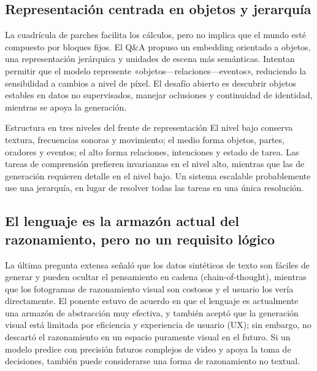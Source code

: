 
\subsection{Representación centrada en objetos y jerarquía}

La cuadrícula de parches facilita los cálculos, pero no implica que el mundo esté compuesto por bloques fijos. El Q\&A propuso un embedding orientado a objetos, una representación jerárquica y unidades de escena más semánticas. Intentan permitir que el modelo represente «objetos—relaciones—eventos», reduciendo la sensibilidad a cambios a nivel de píxel. El desafío abierto es descubrir objetos estables en datos no supervisados, manejar oclusiones y continuidad de identidad, mientras se apoya la generación.

\begin{knowledgebox}{Estructura en tres niveles del frente de representación}
El nivel bajo conserva textura, frecuencias sonoras y movimiento; el medio forma objetos, partes, oradores y eventos; el alto forma relaciones, intenciones y estado de tarea. Las tareas de comprensión prefieren invarianzas en el nivel alto, mientras que las de generación requieren detalle en el nivel bajo. Un sistema escalable probablemente use una jerarquía, en lugar de resolver todas las tareas en una única resolución.
\end{knowledgebox}

\subsection{El lenguaje es la armazón actual del razonamiento, pero no un requisito lógico}

La última pregunta extensa señaló que los datos sintéticos de texto son fáciles de generar y pueden ocultar el pensamiento en cadena (chain-of-thought), mientras que los fotogramas de razonamiento visual son costosos y el usuario los vería directamente. El ponente estuvo de acuerdo en que el lenguaje es actualmente una armazón de abstracción muy efectiva, y también aceptó que la generación visual está limitada por eficiencia y experiencia de usuario (UX); sin embargo, no descartó el razonamiento en un espacio puramente visual en el futuro. Si un modelo predice con precisión futuros complejos de video y apoya la toma de decisiones, también puede considerarse una forma de razonamiento no textual.

